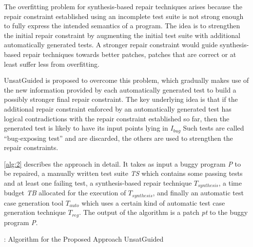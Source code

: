 The overfitting problem for synthesis-based repair techniques arises because the repair constraint established using an incomplete test suite is not strong enough to fully express the intended semantics of a program.
The idea is to strengthen the initial repair constraint by augmenting the initial test suite with additional automatically generated tests. 
A stronger repair constraint would guide synthesis-based repair techniques towards better patches, \ie patches that are correct or at least suffer less from overfitting.

UnsatGuided is proposed to overcome this problem, which gradually makes use of the new information provided by each automatically generated test to build a possibly stronger final repair constraint. 
The key underlying idea is that if the additional repair constraint enforced by an automatically generated test has logical contradictions with the repair constraint established so far, then the generated test is likely to have its input points lying in $I_{bug}$
Such tests are called ``bug-exposing test'' and are discarded, the others are used to strengthen the repair constraints.

\autoref{alg:2} describes the approach in detail. 
It takes as input a buggy program \emph{P} to be repaired, a manually written test suite \emph{TS} which contains some passing tests and at least one failing test, a synthesis-based repair technique $T_{synthesis}$, a time budget \emph{TB} allocated for the execution of $T_{synthesis}$, and finally an automatic test case generation tool $T_{auto}$ which uses a certain kind of automatic test case generation technique $T_{reg}$. 
The output of the algorithm is a patch \emph{pt} to the buggy program \emph{P}.

\begin{algorithm}[t]
	\begin{algorithmic}[1]
		\Else
			\EndFor
				\Else
				\EndIf
			\EndFor
		\EndIf
	\end{algorithmic}
	\caption{: Algorithm for the Proposed Approach UnsatGuided}
	\label{alg:2}
\end{algorithm}

